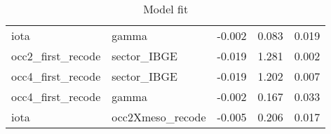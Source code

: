 \begin{table}[h!] \centering 
\caption{Model fit}
\begin{tabular}{llccc}
\toprule
iota	& gamma	& -0.002	& 0.083	& 0.019	 \\ 
occ2\_first\_recode	& sector\_IBGE	& -0.019	& 1.281	& 0.002	 \\ 
occ4\_first\_recode	& sector\_IBGE	& -0.019	& 1.202	& 0.007	 \\ 
occ4\_first\_recode	& gamma	& -0.002	& 0.167	& 0.033	 \\ 
iota	& occ2Xmeso\_recode	& -0.005	& 0.206	& 0.017	 \\ 
\bottomrule  
\end{tabular} 
\label{table:model_fit} 
\end{table} 
